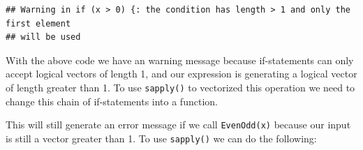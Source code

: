 \documentclass[
]{book}
\newenvironment{Shaded}{\begin{snugshade}}{\end{snugshade}}
\newcommand{\ControlFlowTok}[1]{\textcolor[rgb]{0.13,0.29,0.53}{\textbf{#1}}}
\newcommand{\DecValTok}[1]{\textcolor[rgb]{0.00,0.00,0.81}{#1}}
\newcommand{\KeywordTok}[1]{\textcolor[rgb]{0.13,0.29,0.53}{\textbf{#1}}}
\newcommand{\NormalTok}[1]{#1}
\newcommand{\OperatorTok}[1]{\textcolor[rgb]{0.81,0.36,0.00}{\textbf{#1}}}
\newcommand{\StringTok}[1]{\textcolor[rgb]{0.31,0.60,0.02}{#1}}
\begin{document}
\begin{Shaded}
\end{Shaded}

\begin{verbatim}
## Warning in if (x > 0) {: the condition has length > 1 and only the first element
## will be used
\end{verbatim}

With the above code we have an warning message because if-statements can only accept logical vectors of length 1, and our expression is generating a logical vector of length greater than 1. To use \texttt{sapply()} to vectorized this operation we need to change this chain of if-statements into a function.

\begin{Shaded}
\end{Shaded}

This will still generate an error message if we call \texttt{EvenOdd(x)} because our input is still a vector greater than 1. To use \texttt{sapply()} we can do the following:
\end{document}
